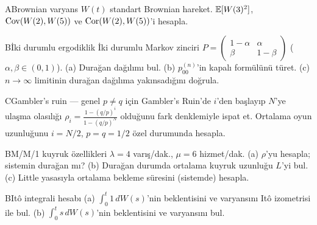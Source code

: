 \begin{alistirma}[Al.10.3]{A}{Brownian varyans}
$W(t)$ standart Brownian hareket. $\mathbb{E}[W(3)^2]$, $\operatorname{Cov}(W(2),W(5))$ ve $\operatorname{Cor}(W(2),W(5))$'i hesapla.
\end{alistirma}
\begin{alistirma}[Al.10.4]{B}{İki durumlu ergodiklik}
İki durumlu Markov zinciri $P=\begin{pmatrix}1-\alpha&\alpha\\\beta&1-\beta\end{pmatrix}$ ($\alpha,\beta\in(0,1)$). (a) Durağan dağılımı bul. (b) $p_{00}^{(n)}$'in kapalı formülünü türet. (c) $n\to\infty$ limitinin durağan dağılıma yakınsadığını doğrula.
\end{alistirma}
\begin{alistirma}[Al.10.5]{C}{Gambler's ruin --- genel}
$p\neq q$ için Gambler's Ruin'de $i$'den başlayıp $N$'ye ulaşma olasılığı $\rho_i=\frac{1-(q/p)^i}{1-(q/p)^N}$ olduğunu fark denklemiyle ispat et. Ortalama oyun uzunluğunu $i=N/2$, $p=q=1/2$ özel durumunda hesapla.
\end{alistirma}
\begin{alistirma}[Al.10.6]{B}{M/M/1 kuyruk özellikleri}
$\lambda=4$ varış/dak., $\mu=6$ hizmet/dak. (a) $\rho$'yu hesapla; sistemin durağan mı? (b) Durağan durumda ortalama kuyruk uzunluğu $L$'yi bul. (c) Little yasasıyla ortalama bekleme süresini (sistemde) hesapla.
\end{alistirma}
\alistirmalar





\begin{alistirma}[Al.10.7]{B}{Itô integrali hesabı}
(a) $\int_0^t 1\,dW(s)$'nin beklentisini ve varyansını Itô izometrisi ile bul. (b) $\int_0^t s\,dW(s)$'nin beklentisini ve varyansını bul.
\end{alistirma}

